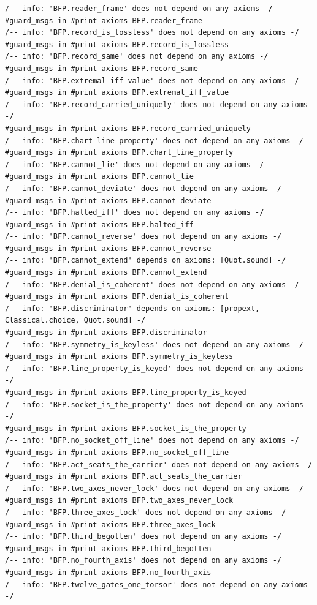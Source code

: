 \documentclass[10pt,twocolumn]{article}
\begin{document}
\begin{Verbatim}
/-- info: 'BFP.reader_frame' does not depend on any axioms -/
#guard_msgs in #print axioms BFP.reader_frame
/-- info: 'BFP.record_is_lossless' does not depend on any axioms -/
#guard_msgs in #print axioms BFP.record_is_lossless
/-- info: 'BFP.record_same' does not depend on any axioms -/
#guard_msgs in #print axioms BFP.record_same
/-- info: 'BFP.extremal_iff_value' does not depend on any axioms -/
#guard_msgs in #print axioms BFP.extremal_iff_value
/-- info: 'BFP.record_carried_uniquely' does not depend on any axioms -/
#guard_msgs in #print axioms BFP.record_carried_uniquely
/-- info: 'BFP.chart_line_property' does not depend on any axioms -/
#guard_msgs in #print axioms BFP.chart_line_property
/-- info: 'BFP.cannot_lie' does not depend on any axioms -/
#guard_msgs in #print axioms BFP.cannot_lie
/-- info: 'BFP.cannot_deviate' does not depend on any axioms -/
#guard_msgs in #print axioms BFP.cannot_deviate
/-- info: 'BFP.halted_iff' does not depend on any axioms -/
#guard_msgs in #print axioms BFP.halted_iff
/-- info: 'BFP.cannot_reverse' does not depend on any axioms -/
#guard_msgs in #print axioms BFP.cannot_reverse
/-- info: 'BFP.cannot_extend' depends on axioms: [Quot.sound] -/
#guard_msgs in #print axioms BFP.cannot_extend
/-- info: 'BFP.denial_is_coherent' does not depend on any axioms -/
#guard_msgs in #print axioms BFP.denial_is_coherent
/-- info: 'BFP.discriminator' depends on axioms: [propext, Classical.choice, Quot.sound] -/
#guard_msgs in #print axioms BFP.discriminator
/-- info: 'BFP.symmetry_is_keyless' does not depend on any axioms -/
#guard_msgs in #print axioms BFP.symmetry_is_keyless
/-- info: 'BFP.line_property_is_keyed' does not depend on any axioms -/
#guard_msgs in #print axioms BFP.line_property_is_keyed
/-- info: 'BFP.socket_is_the_property' does not depend on any axioms -/
#guard_msgs in #print axioms BFP.socket_is_the_property
/-- info: 'BFP.no_socket_off_line' does not depend on any axioms -/
#guard_msgs in #print axioms BFP.no_socket_off_line
/-- info: 'BFP.act_seats_the_carrier' does not depend on any axioms -/
#guard_msgs in #print axioms BFP.act_seats_the_carrier
/-- info: 'BFP.two_axes_never_lock' does not depend on any axioms -/
#guard_msgs in #print axioms BFP.two_axes_never_lock
/-- info: 'BFP.three_axes_lock' does not depend on any axioms -/
#guard_msgs in #print axioms BFP.three_axes_lock
/-- info: 'BFP.third_begotten' does not depend on any axioms -/
#guard_msgs in #print axioms BFP.third_begotten
/-- info: 'BFP.no_fourth_axis' does not depend on any axioms -/
#guard_msgs in #print axioms BFP.no_fourth_axis
/-- info: 'BFP.twelve_gates_one_torsor' does not depend on any axioms -/

\end{Verbatim}
\end{document}
